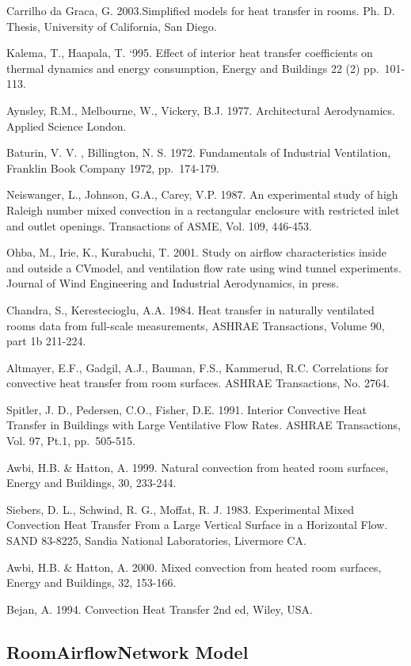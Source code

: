Carrilho da Graca, G. 2003.Simplified models for heat transfer in rooms. Ph. D. Thesis, University of California, San Diego.

Kalema, T., Haapala, T. `995. Effect of interior heat transfer coefficients on thermal dynamics and energy consumption, Energy and Buildings 22 (2) pp.~101-113.

Aynsley, R.M., Melbourne, W., Vickery, B.J. 1977. Architectural Aerodynamics. Applied Science London.

Baturin, V. V. , Billington, N. S. 1972. Fundamentals of Industrial Ventilation, Franklin Book Company 1972, pp.~174-179.

Neiswanger, L., Johnson, G.A., Carey, V.P. 1987. An experimental study of high Raleigh number mixed convection in a rectangular enclosure with restricted inlet and outlet openings. Transactions of ASME, Vol. 109, 446-453.

Ohba, M., Irie, K., Kurabuchi, T. 2001. Study on airflow characteristics inside and outside a CVmodel, and ventilation flow rate using wind tunnel experiments. Journal of Wind Engineering and Industrial Aerodynamics, in press.

Chandra, S., Kerestecioglu, A.A. 1984. Heat transfer in naturally ventilated rooms data from full-scale measurements, ASHRAE Transactions, Volume 90, part 1b 211-224.

Altmayer, E.F., Gadgil, A.J., Bauman, F.S., Kammerud, R.C. Correlations for convective heat transfer from room surfaces. ASHRAE Transactions, No. 2764.

Spitler, J. D., Pedersen, C.O., Fisher, D.E. 1991. Interior Convective Heat Transfer in Buildings with Large Ventilative Flow Rates. ASHRAE Transactions, Vol. 97, Pt.1, pp.~505-515.

Awbi, H.B. \& Hatton, A. 1999. Natural convection from heated room surfaces, Energy and Buildings, 30, 233-244.

Siebers, D. L., Schwind, R. G., Moffat, R. J. 1983. Experimental Mixed Convection Heat Transfer From a Large Vertical Surface in a Horizontal Flow. SAND 83-8225, Sandia National Laboratories, Livermore CA.

Awbi, H.B. \& Hatton, A. 2000. Mixed convection from heated room surfaces, Energy and Buildings, 32, 153-166.

Bejan, A. 1994. Convection Heat Transfer 2nd ed, Wiley, USA.

\subsection{RoomAirflowNetwork Model}\label{roomairflownetwork-model}

